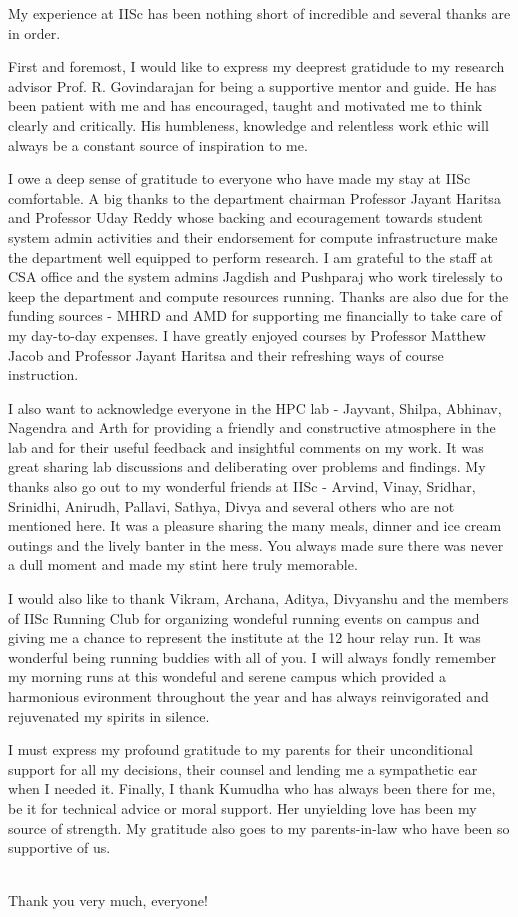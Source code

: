 My experience at IISc has been nothing short of incredible and several thanks are in order.
\par First and foremost, I would like to express my deeprest gratidude to my research advisor Prof. R. Govindarajan for being a supportive mentor and guide. He has been patient with me and has encouraged, taught and motivated me to think clearly and critically. His humbleness, knowledge and relentless work ethic will always be a constant source of inspiration to me.
\par I owe a deep sense of gratitude to everyone who have made my stay at IISc comfortable. A big thanks to the department chairman Professor Jayant Haritsa and Professor Uday Reddy whose backing and ecouragement towards student system admin activities and their endorsement for compute infrastructure make the department well equipped to perform research. I am grateful to the staff at CSA office and the system admins Jagdish and Pushparaj who work tirelessly to keep the department and compute resources running. Thanks are also due for the funding sources - MHRD and AMD for supporting me financially to take care of my day-to-day expenses. I have greatly enjoyed courses by Professor Matthew Jacob and Professor Jayant Haritsa and their refreshing ways of course instruction.
\par I also want to acknowledge everyone in the HPC lab - Jayvant, Shilpa, Abhinav, Nagendra and Arth for providing a friendly and constructive atmosphere in the lab and for their useful feedback and insightful comments on my work. It was great sharing lab discussions and deliberating over problems and findings. My thanks also go out to my wonderful friends at IISc - Arvind, Vinay, Sridhar, Srinidhi, Anirudh, Pallavi, Sathya, Divya and several others who are not mentioned here. It was a pleasure sharing the many meals, dinner and ice cream outings and the lively banter in the mess. You always made sure there was never a dull moment and made my stint here truly memorable.
\par I would also like to thank Vikram, Archana, Aditya, Divyanshu and the members of IISc Running Club for organizing wondeful running events on campus and giving me a chance to represent the institute at the 12 hour relay run. It was wonderful being running buddies with all of you. I will always fondly remember my morning runs at this wondeful and serene campus which provided a harmonious evironment throughout the year and has always reinvigorated and rejuvenated my spirits in silence.
\par I must express my profound gratitude to my parents for their unconditional support for all my decisions, their counsel and lending me a sympathetic ear when I needed it. Finally, I thank Kumudha who has always been there for me, be it for technical advice or moral support. Her unyielding love has been my source of strength. My gratitude also goes to my parents-in-law who have been so supportive of us.\\
\\
\par Thank you very much, everyone!